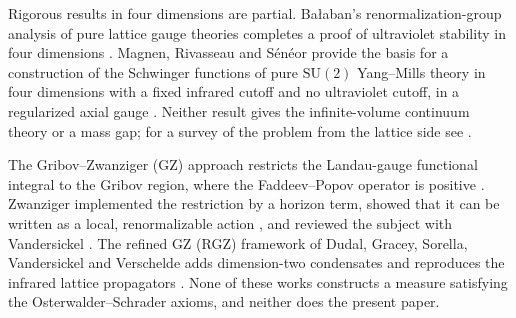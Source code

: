 \documentclass[11pt,a4paper]{amsart}
\theoremstyle{definition}
\begin{document}
Rigorous results in four dimensions are partial. Ba\l{}aban's renormalization-group analysis of pure lattice gauge theories completes a proof of ultraviolet stability in four dimensions \cite{balaban1987renormalization, balaban1989large}. Magnen, Rivasseau and S\'en\'eor provide the basis for a construction of the Schwinger functions of pure $\mathrm{SU}(2)$ Yang--Mills theory in four dimensions with a fixed infrared cutoff and no ultraviolet cutoff, in a regularized axial gauge \cite{magnen1993construction}. Neither result gives the infinite-volume continuum theory or a mass gap; for a survey of the problem from the lattice side see \cite{chatterjee2019yangmills}.

The Gribov--Zwanziger (GZ) approach restricts the Landau-gauge functional integral to the Gribov region, where the Faddeev--Popov operator is positive \cite{gribov1978quantization}. Zwanziger implemented the restriction by a horizon term, showed that it can be written as a local, renormalizable action \cite{zwanziger1982nonperturbative, zwanziger1989local, zwanziger1993renormalizability}, and reviewed the subject with Vandersickel \cite{vandersickel2012gribov}. The refined GZ (RGZ) framework of Dudal, Gracey, Sorella, Vandersickel and Verschelde adds dimension-two condensates and reproduces the infrared lattice propagators \cite{dudal2008new, dudal2008condensates}. None of these works constructs a measure satisfying the Osterwalder--Schrader axioms, and neither does the present paper.
\end{document}
